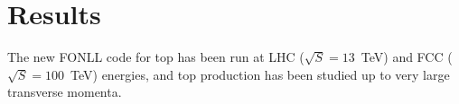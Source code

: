 \documentclass{PoS}
\def\ba{\begin{eqnarray}}
\def\ea{\end{eqnarray}}
\begin{document}
% 
% 
% 

\section{Results}

The new FONLL code for top has been run at LHC ($\sqrt{S} = 13$~TeV) and FCC
($\sqrt{S} = 100$~TeV) energies, and top production has been studied up to very large
transverse momenta.
\end{document}
